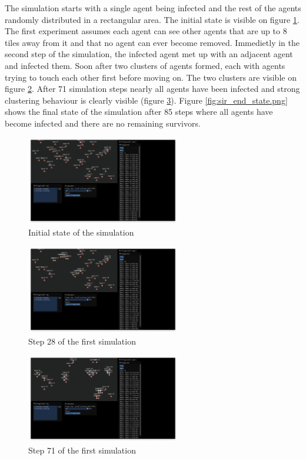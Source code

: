The simulation starts with a single agent being infected and the rest of the agents randomly distributed in a rectangular area.
The initial state is visible on figure \ref{fig:sir_initial_state.png}.
The first experiment assumes each agent can see other agents that are up to 8 tiles away from it and that no agent can ever become removed.
Immedietly in the second step of the simulation, the infected agent met up with an adjacent agent and infected them.
Soon after two clusters of agents formed, each with agents trying to touch each other first before moving on.
The two clusters are visible on figure \ref{fig:sir_step28.png}.
After 71 simulation steps nearly all agents have been infected and strong clustering behaviour is clearly visible (figure \ref{fig:sir_step71.png}).
Figure \ref{fig:sir_end_state.png} shows the final state of the simulation after 85 steps where all agents have become infected and there are no remaining survivors.

\begin{figure}[h]
    \centering
    \includegraphics[width=0.6\textwidth]{images/chapter2/sir_initial_state.png}
    \caption{Initial state of the simulation}\label{fig:sir_initial_state.png}
\end{figure}

\begin{figure}[h]
    \centering
    \includegraphics[width=0.6\textwidth]{images/chapter2/sir_step28.png}
    \caption{Step 28 of the first simulation}\label{fig:sir_step28.png}
\end{figure}

\begin{figure}[h]
    \centering
    \includegraphics[width=0.6\textwidth]{images/chapter2/sir_step71.png}
    \caption{Step 71 of the first simulation}\label{fig:sir_step71.png}
\end{figure}

